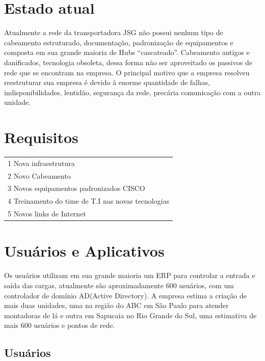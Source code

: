 \documentclass[	DIV=calc,%
							paper=a4,%
							fontsize=12pt,%
							onecolumn]{scrartcl}	 					%
\begin{document}
\section{Estado atual}
	Atualmente a rede da transportadora JSG não possui nenhum tipo de cabeamento estruturado, documentação, padronização de equipamentos e composta em sua grande maioria de Hubs “cascateado”.  
	Cabeamento antigos e danificados, tecnologia obsoleta, dessa forma não ser aproveitado os passivos de rede que se encontram na empresa.
	O principal motivo que a empresa resolveu reestruturar sua empresa é devido à enorme quantidade de falhas, indisponibilidades, lentidão, segurança da rede, precária comunicação com a outra unidade.

\section{Requisitos}


\begin{tabular}{l}
{\color[HTML]{000000} 1 Nova infraestrutura}                              \\
{\color[HTML]{000000} 2 Novo Cabeamento}                                  \\
{\color[HTML]{000000} 3 Novos equipamentos padronizados CISCO}            \\
{\color[HTML]{000000} 4 Treinamento do time de T.I nas novas tecnologias} \\
{\color[HTML]{000000} 5 Novos links de Internet}                         
\end{tabular}


\section{Usuários e Aplicativos}

Os usuários utilizam em sua grande maioria um ERP para controlar a entrada e saída das cargas, atualmente são aproximadamente 600 usuários, com um controlador de domínio AD(Active Directory). A empresa estima a criação de mais duas unidades, uma na região do ABC em São Paulo para atender montadoras de lá e outra em Sapucaia no Rio Grande do Sul, uma estimativa de mais 600 usuários e pontos de rede.
 

\subsection{Usuários}
\end{document}
